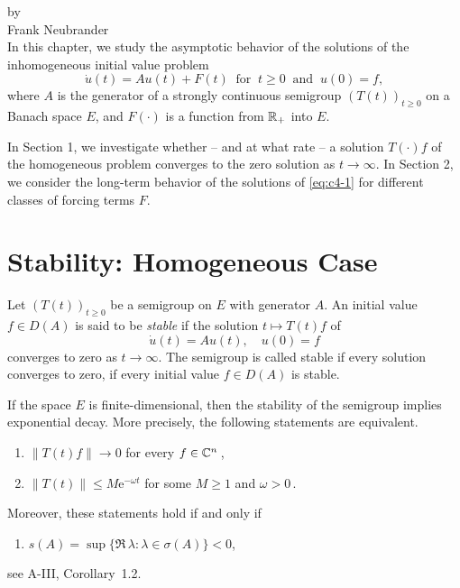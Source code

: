 \label{chap:a4}%
{\Large
\vspace*{-.75cm}
by \\[.25em]
Frank Neubrander
\vspace{.75cm}
\\
}
In this chapter, we study the asymptotic behavior of the solutions of the inhomogeneous initial value problem
\begin{equation}\label{eq:c4-1}
\dot{u}(t) = Au(t) + F(t) \ \text{ for } \  t \geq 0 \ \text{ and } \  
 u(0) = f, \tag{*}
\end{equation}
where $ A $ is the generator of a strongly continuous semigroup $ (T(t))_{t \geq 0} $ on a Banach space $ E $, and $ F(\cdot) $ is a function from $ \mathbb{R}_{+} $ into $ E $.

In Section 1, we investigate whether -- and at what rate -- a solution $ T(\cdot)f $ of the homogeneous problem converges to the zero solution as $ t \to \infty $. 
In Section 2, we consider the long-term behavior of the solutions of \eqref{eq:c4-1} for different classes of forcing terms $ F $.
\section{Stability: Homogeneous Case}\label{sec:c4-1}%
Let $ (T(t))_{t \geq 0} $ be a semigroup on $ E $ with generator $ A $.
An initial value $ f \in D(A) $ is said to be \emph{stable} if the solution $ t \mapsto T(t)f $ of
\begin{equation}\label{eq:c4-2}
\dot{u}(t) = Au(t), \quad u(0) = f \tag{ACP}
\end{equation}
converges to zero as $ t \to \infty $. 
The semigroup is called stable if every solution converges to zero, \ie if every initial value $ f \in D(A) $ is stable.

If the space $ E $ is finite-dimensional, then the stability of the semigroup implies exponential decay. 
More precisely, the following statements are equivalent.
\begin{enumerate}[\upshape (a)]
\item 
$ \|T(t)f\| \to 0 $ for every $ f \in \mathbb{C}^{n} $\,,

\item 
$ \|T(t)\| \leq M \mathrm{e}^{-\omega t} $ for some $M \geq 1$ and  $\omega > 0 $\,.
\end{enumerate}
Moreover, these statements hold if and only if
\begin{enumerate}
\item 
$s(A) = \sup\{\Re\,\lambda \colon \lambda \in \sigma(A)\} < 0$, 
\end{enumerate}
see A-III, Corollary~1.2.

